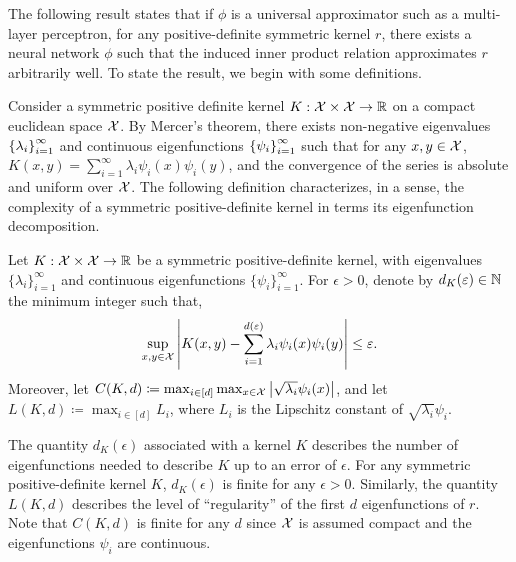 
The following result states that if $\phi$ is a universal approximator such as a multi-layer perceptron, for any positive-definite symmetric kernel $r$, there exists a neural network $\phi$ such that the induced inner product relation approximates $r$ arbitrarily well. To state the result, we begin with some definitions.

Consider a symmetric positive definite kernel $K: {\mathcal{X}} \times {\mathcal{X}} \to \mathbb{R}$ on a compact euclidean space ${\mathcal{X}}$. By Mercer's theorem\parencite{mercerFunctionsPositive1909, sunMercerTheorem2005, micchelliUniversalKernels2006}, there exists non-negative eigenvalues $\left\{\lambda_i\right\}_{i=1}^{\infty}$ and continuous eigenfunctions $\left\{\psi_i\right\}_{i=1}^{\infty}$ such that for any $x,y \in {\mathcal{X}}$, $K(x, y) = \sum_{i=1}^\infty \lambda_i \psi_i(x) \psi_i(y)$, and the convergence of the series is absolute and uniform over ${\mathcal{X}}$. The following definition characterizes, in a sense, the complexity of a symmetric positive-definite kernel in terms its eigenfunction decomposition.

\begin{definition}\label{def:sym_pd_ker_specturm_decay}
	Let $K: {\mathcal{X}} \times {\mathcal{X}} \to \mathbb{R}$ be a symmetric positive-definite kernel, with eigenvalues $\{\lambda_i\}_{i=1}^{\infty}$ and continuous eigenfunctions $\{\psi_i\}_{i=1}^{\infty}$. For $\epsilon > 0$, denote by $d_K(\varepsilon) \in \mathbb{N}$ the minimum integer such that,
	\begin{equation*}
		\sup_{x, y \in \calX} \abs{K(x, y) - \sum_{i=1}^{d(\epsilon)} \lambda_i \psi_i(x) \psi_i(y)} \leq \epsilon.
	\end{equation*}
	Moreover, let $C(K, d) \coloneq \max_{i \in [d]} \max_{x \in {\mathcal{X}}} \left\lvert\sqrt{\lambda_i} \psi_i(x)\right\rvert$, and let $L(K, d) \coloneq \max_{i \in [d]} L_i$, where $L_i$ is the Lipschitz constant of $\sqrt{\lambda_i} \psi_i$.
\end{definition}

The quantity $d_K(\epsilon)$ associated with a kernel $K$ describes the number of eigenfunctions needed to describe $K$ up to an error of $\epsilon$. For any symmetric positive-definite kernel $K$, $d_K(\epsilon)$ is finite for any $\epsilon > 0$. Similarly, the quantity $L(K, d)$ describes the level of ``regularity'' of the first $d$ eigenfunctions of $r$. Note that $C(K, d)$ is finite for any $d$ since ${\mathcal{X}}$ is assumed compact and the eigenfunctions $\psi_i$ are continuous.

